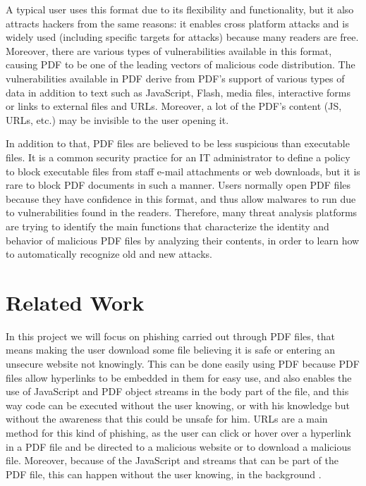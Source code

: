 \documentclass{article}
\begin{document}
\indent A typical user uses this format due to its flexibility and functionality, but it also attracts hackers from the same reasons: it enables cross platform attacks and is widely used (including specific targets for attacks) because many readers are free. Moreover, there are various types of vulnerabilities available in this format, causing PDF to be one of the leading vectors of malicious code distribution. The vulnerabilities available in PDF derive from PDF's support of various types of data in addition to text such as JavaScript, Flash, media files, interactive forms or links to external files and URLs. Moreover, a lot of the PDF's content (JS, URLs, etc.) may be invisible to the user opening it.

\indent In addition to that, PDF files are believed to be less suspicious than executable files. It is a common security practice for an IT administrator to define a policy to block executable files from staff e-mail attachments or web downloads, but it is rare to block PDF documents in such a manner. Users normally open PDF files because they have confidence in this format, and thus allow malwares to run due to vulnerabilities found in the readers. Therefore, many threat analysis platforms are trying to identify the main functions that characterize the identity and behavior of malicious PDF files by analyzing their contents, in order to learn how to automatically recognize old and new attacks.

\section{Related Work}
\indent In this project we will focus on phishing carried out through PDF files, that means making the user download some file believing it is safe or entering an unsecure website not knowingly. This can be done easily using PDF because PDF files allow hyperlinks to be embedded in them for easy use, and also enables the use of JavaScript and PDF object streams in the body part of the file, and this way code can be executed without the user knowing, or with his knowledge but without the awareness that this could be unsafe for him. URLs are a main method for this kind of phishing, as the user can click or hover over a hyperlink in a PDF file and be directed to a malicious website or to download a malicious file. Moreover, because of the JavaScript and streams that can be part of the PDF file, this can happen without the user knowing, in the background \cite{Bonan2018ML} \cite{JSSrndic2011Laskov}.
\end{document}
